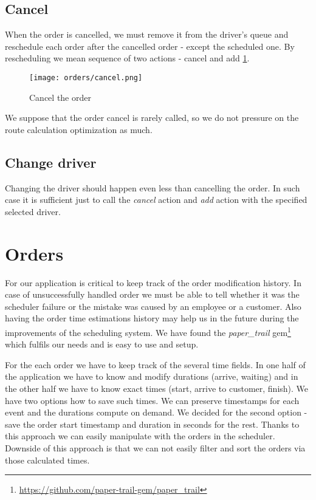 \subsection{Cancel}
	When the order is cancelled, we must remove it from the driver's queue and reschedule each order after the cancelled order - except the scheduled one. By rescheduling we mean sequence of two actions - cancel and add \ref{order-process-cancel}.
	
	\begin{figure}[h]\centering
		\texttt{[image: orders/cancel.png]}
		\caption{Cancel the order} 
		\label{order-process-cancel}
	\end{figure} 
	We suppose that the order cancel is rarely called, so we do not pressure on the route calculation optimization as much.

\subsection{Change driver}
Changing the driver should happen even less than cancelling the order. In such case it is sufficient just to call the \textit{cancel} action and \textit{add} action with the specified selected driver.
	 
	 
	 
\section {Orders}

	For our application is critical to keep track of the order modification history. In case of unsuccessfully handled order we must be able to tell whether it was the scheduler failure or the mistake was caused by an employee or a customer. Also having the order time estimations history may help us in the future during the improvements of the scheduling system. We have found the \textit{paper\_trail} gem\footnote{\url{https://github.com/paper-trail-gem/paper_trail}} which fulfils our needs and is easy to use and setup.
	
	
	For the each order we have to keep track of the several time fields. In one half of the application we have to know and modify durations (arrive, waiting) and in the other half we have to know exact times (start, arrive to customer, finish). We have two options how to save such times. We can preserve timestamps for each event and the durations compute on demand. We decided for the second option - save the order start timestamp and duration in seconds for the rest. Thanks to this approach we can easily manipulate with the orders in the scheduler.  Downside of this approach is that we can not easily filter and sort the orders via those calculated times.   
